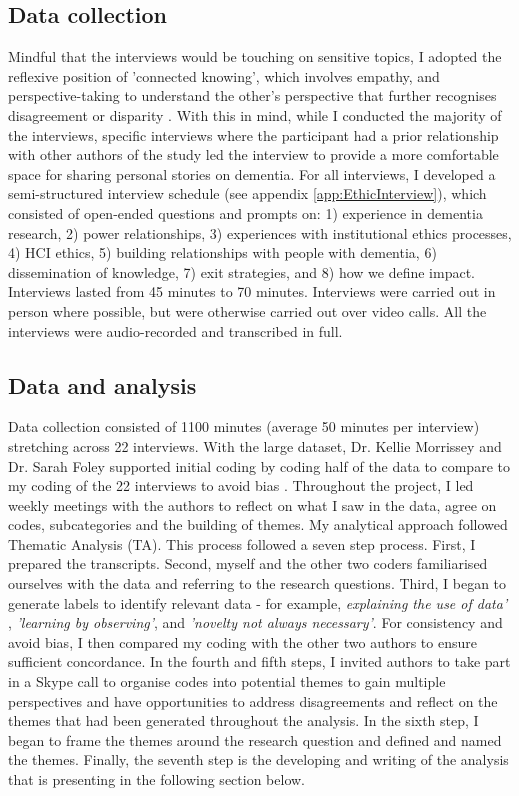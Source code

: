 \subsection{Data collection}
\label{Ethics:dataCollection}
Mindful that the interviews would be touching on sensitive topics, I adopted the reflexive position of 'connected knowing', which involves empathy, and perspective-taking to understand the other's perspective that further recognises disagreement or disparity \citep{belenky_womens_1986}. With this in mind, while I conducted the majority of the interviews, specific interviews where the participant had a prior relationship with other authors of the study led the interview to provide a more comfortable space for sharing personal stories on dementia. For all interviews, I developed a semi-structured interview schedule (see appendix \ref{app:EthicInterview}), which consisted of open-ended questions and prompts on: 1) experience in dementia research, 2) power relationships, 3) experiences with institutional ethics processes, 4) HCI ethics, 5) building relationships with people with dementia, 6) dissemination of knowledge, 7) exit strategies, and 8) how we define impact. Interviews lasted from 45 minutes to 70 minutes. Interviews were carried out in person where possible, but were otherwise carried out over video calls. All the interviews were audio-recorded and transcribed in full.

\subsection{Data and analysis}
\label{Ethics:Analysis}
Data collection consisted of 1100 minutes (average 50 minutes per interview) stretching across 22 interviews. With the large dataset, Dr. Kellie Morrissey and Dr. Sarah Foley supported initial coding by coding half of the data to compare to my coding of the 22 interviews to avoid bias \citep{berends_using_2005}. Throughout the project, I led weekly meetings with the authors to reflect on what I saw in the data, agree on codes, subcategories and the building of themes. My analytical approach followed \cite{braun_using_2006,braun_one_2020} Thematic Analysis (TA). This process followed a seven step process. First, I prepared the transcripts. Second, myself and the other two coders familiarised ourselves with the data and referring to the research questions. Third, I began to generate labels to identify relevant data - for example, \textit{explaining the use of data'}
, \textit{'learning by observing'}, and \textit{'novelty not always necessary'}. For consistency and avoid bias, I then compared my coding with the other two authors to ensure sufficient concordance. In the fourth and fifth steps, I invited authors to take part in a Skype call to organise codes into potential themes to gain multiple perspectives and have opportunities to address disagreements and reflect on the themes that had been generated throughout the analysis. In the sixth step, I began to frame the themes around the research question and defined and named the themes. Finally, the seventh step is the developing and writing of the analysis that is presenting in the following section below.

